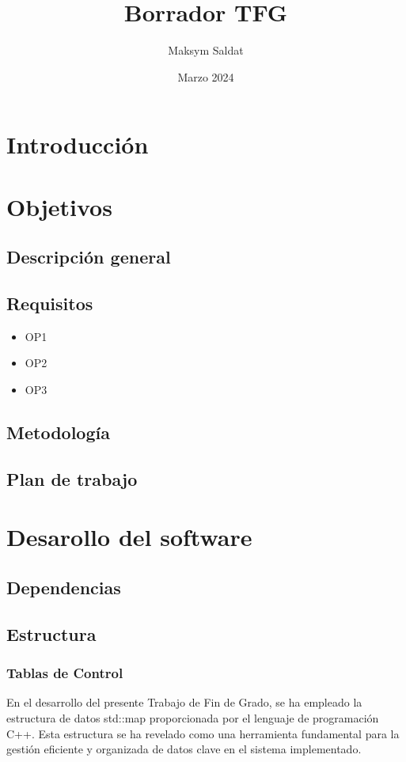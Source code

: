 \documentclass{article}
\title{Borrador TFG}
\author{Maksym Saldat}
\date{Marzo 2024}
\begin{document}
\maketitle

\section{Introducción}

\section{Objetivos}

\subsection{Descripción general}
\subsection{Requisitos}
\begin{itemize}
  \item OP1
  \item OP2
  \item OP3
\end{itemize}

\subsection{Metodología}
\subsection{Plan de trabajo}

\section{Desarollo del software}

\subsection{Dependencias}
\subsection{Estructura}
\subsubsection{Tablas de Control}
    En el desarrollo del presente Trabajo de Fin de Grado, se ha empleado la estructura de datos std::map proporcionada por el lenguaje de programación C++. Esta estructura se ha revelado como una herramienta fundamental para la gestión eficiente y organizada de datos clave en el sistema implementado.
\end{document}
